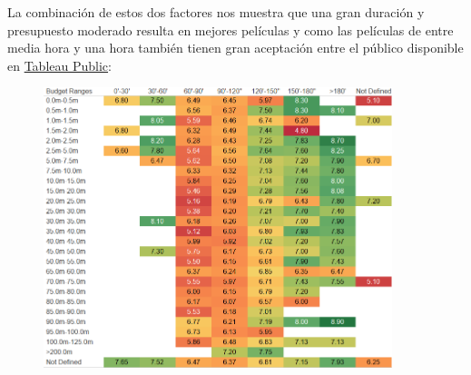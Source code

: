 \documentclass{article}
\begin{document}
\begin{figure}[h]
\centering
{}
\end{figure}

\clearpage

La combinación de estos dos factores nos muestra que una gran duración y presupuesto moderado resulta en mejores películas y como las películas de entre media hora y una hora también tienen gran aceptación entre el público disponible en \href{https://public.tableau.com/profile/javier6580\#!/vizhome/proyecto_fin_de_master_dataset/budget_duration}{Tableau Public}:

\begin{figure}[h]
\centering
\includegraphics[width=4in,clip,keepaspectratio]{./images/budget_duration}
\end{figure}
\end{document}
